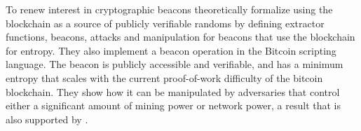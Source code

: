 \item[On Bitcoin as a Source of Public Randomness]
To renew interest in cryptographic beacons \citet{bonneau2015bitcoin} theoretically formalize using the blockchain as a source of publicly verifiable randoms by defining extractor functions, beacons, attacks and manipulation for beacons that use the blockchain for entropy. They also implement a beacon operation in the Bitcoin scripting language. The beacon is publicly accessible and verifiable, and has a minimum entropy that scales with the current proof-of-work difficulty of the bitcoin blockchain. They show how it can be manipulated by adversaries that control either a significant amount of mining power or network power, a result that is also supported by \cite{pierrot2016malleability}. 
